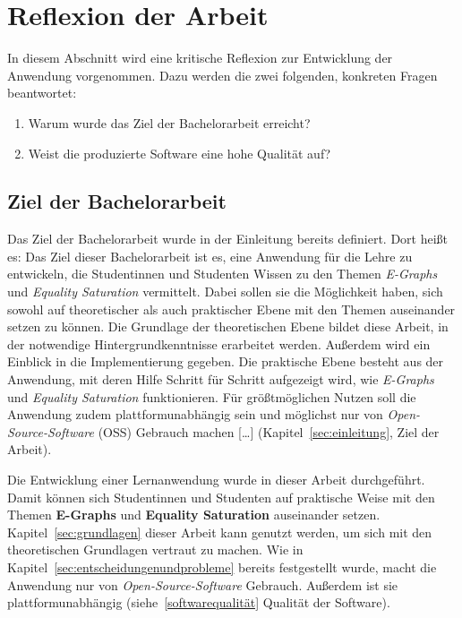 \section{Reflexion der Arbeit}\label{sec:reflexion}

In diesem Abschnitt wird eine kritische Reflexion zur Entwicklung der Anwendung vorgenommen. Dazu werden die zwei folgenden, konkreten Fragen beantwortet:

\begin{enumerate}[nolistsep]
    \item Warum wurde das Ziel der Bachelorarbeit erreicht?
    \item Weist die produzierte Software eine hohe Qualität auf?
\end{enumerate}

\subsection{Ziel der Bachelorarbeit}

Das Ziel der Bachelorarbeit wurde in der Einleitung bereits definiert. Dort heißt es: 
\glqq Das Ziel dieser Bachelorarbeit ist es, eine Anwendung für die Lehre zu entwickeln, die Studentinnen und Studenten Wissen zu den Themen \textit{E-Graphs} und \textit{Equality Saturation}
vermittelt. Dabei sollen sie die Möglichkeit haben, sich sowohl auf theoretischer als auch praktischer Ebene mit den Themen auseinander setzen zu können.
Die Grundlage der theoretischen Ebene bildet diese Arbeit, in der notwendige Hintergrundkenntnisse erarbeitet werden. Außerdem wird ein Einblick in die Implementierung gegeben. 
Die praktische Ebene besteht aus der Anwendung, mit deren Hilfe Schritt für Schritt aufgezeigt wird, wie \textit{E-Graphs} und \textit{Equality Saturation} funktionieren.
Für grö{\ss}tmöglichen Nutzen soll die Anwendung zudem plattformunabhängig sein und möglichst nur von \textit{Open-Source-Software} (OSS) Gebrauch machen [\ldots]\grqq 
(Kapitel~\ref{sec:einleitung}, Ziel der Arbeit).

Die Entwicklung einer Lernanwendung wurde in dieser Arbeit durchgeführt. Damit können sich Studentinnen und Studenten auf praktische Weise mit den Themen 
\textbf{E-Graphs} und \textbf{Equality Saturation} auseinander setzen. Kapitel~\ref{sec:grundlagen} dieser Arbeit kann genutzt werden, um sich mit den
theoretischen Grundlagen vertraut zu machen. 
Wie in Kapitel~\ref{sec:entscheidungenundprobleme} bereits festgestellt wurde, macht die Anwendung nur von \textit{Open-Source-Software} Gebrauch. Außerdem ist
sie plattformunabhängig (siehe~\ref{softwarequalität} Qualität der Software).




